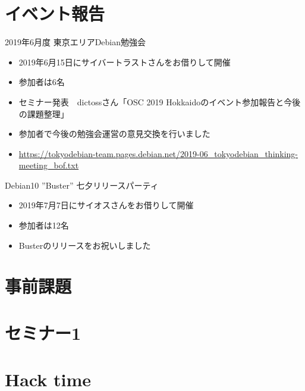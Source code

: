 \section{イベント報告}

\begin{frame}{2019年6月度 東京エリアDebian勉強会}
\begin{itemize}
\item 2019年6月15日にサイバートラストさんをお借りして開催
\item 参加者は6名
\item セミナー発表　dictossさん「OSC 2019 Hokkaidoのイベント参加報告と今後の課題整理」
\item 参加者で今後の勉強会運営の意見交換を行いました
\item \url{https://tokyodebian-team.pages.debian.net/2019-06_tokyodebian_thinking-meeting_bof.txt}
\end{itemize} 
\end{frame}

\begin{frame}{Debian10 ''Buster'' 七夕リリースパーティ}
\begin{itemize}
\item 2019年7月7日にサイオスさんをお借りして開催
\item 参加者は12名
\item Busterのリリースをお祝いしました
\end{itemize} 
\end{frame}


\section{事前課題}


{\footnotesize
 
}

%

\section{セミナー1}

\section{Hack time}

